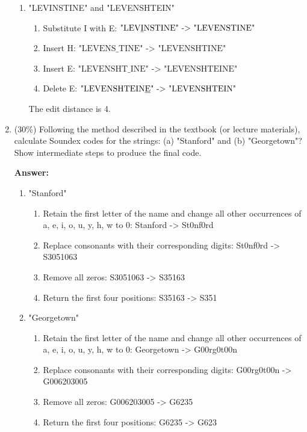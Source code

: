\documentclass[11pt]{article}
\begin{document}
\begin{enumerate}
\begin{enumerate}
            \item "LEVINSTINE" and "LEVENSHTEIN"
            \begin{enumerate}
                \item Substitute I with E: $\text{"LEV\underline{I}NSTINE" -> "LEVENSTINE"}$
                \item Insert H: $\text{"LEVENS\_TINE" -> "LEVENSHTINE"}$
                \item Insert E: $\text{"LEVENSHT\_INE" -> "LEVENSHTEINE"}$
                \item Delete E: $\text{"LEVENSHTEIN\underline{E}" -> "LEVENSHTEIN"}$
            \end{enumerate}
            The edit distance is 4.

        \end{enumerate}

        \item (30\%) Following the method described in the textbook (or lecture materials), calculate Soundex codes for the strings: (a) "Stanford" and (b) "Georgetown"? Show intermediate steps to produce the final code.

        \textbf{Answer:}
        \begin{enumerate}
            \item "Stanford"
            \begin{enumerate}
                \item Retain the first letter of the name and change all other occurrences of a, e, i, o, u, y, h, w to 0: Stanford -> St0nf0rd
                \item Replace consonants with their corresponding digits: St0nf0rd -> S3051063
                \item Remove all zeros: S3051063 -> S35163
                \item Return the first four positions: S35163 -> S351
            \end{enumerate}

            \item "Georgetown"
            \begin{enumerate}
                \item Retain the first letter of the name and change all other occurrences of a, e, i, o, u, y, h, w to 0: Georgetown -> G00rg0t00n
                \item Replace consonants with their corresponding digits: G00rg0t00n -> G006203005
                \item Remove all zeros: G006203005 -> G6235
                \item Return the first four positions: G6235 -> G623
            \end{enumerate}
        \end{enumerate}

    \end{enumerate}
\end{document}
